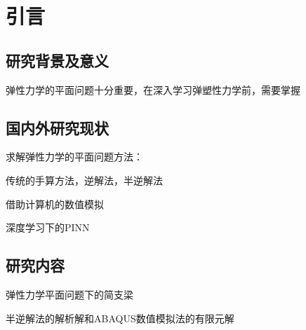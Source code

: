 \chapter{引言}
\label{cha:intro}
\section{研究背景及意义}

弹性力学的平面问题十分重要，在深入学习弹塑性力学前，需要掌握


\section{国内外研究现状}
求解弹性力学的平面问题方法：

传统的手算方法，逆解法，半逆解法

借助计算机的数值模拟

深度学习下的PINN

\section{研究内容}
弹性力学平面问题下的简支梁

半逆解法的解析解和ABAQUS数值模拟法的有限元解
